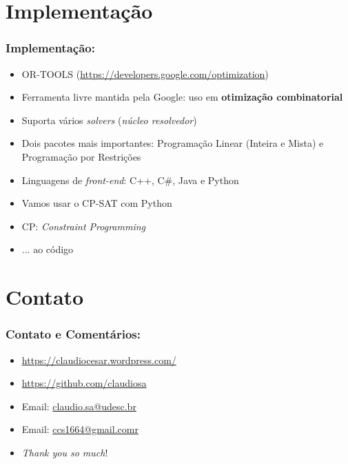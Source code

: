 \documentclass{beamer}
\begin{document}
\section{Implementação}
\begin{frame} 
	\frametitle{Implementação:}
	
	\begin{block}{}
		
		\begin{itemize}
			\item OR-TOOLS  (\url{https://developers.google.com/optimization})
			\item Ferramenta livre mantida pela Google: uso em \textbf{otimização combinatorial}
			\item Suporta vários \textit{solvers} (\textit{núcleo resolvedor})
			\item Dois pacotes mais importantes: Programação Linear (Inteira e Mista)  e Programação por Restrições
			\item Linguagens de \textit{front-end}: C++, C\#, Java e Python
			\item Vamos usar  o CP-SAT com Python
			\item CP: \textit{Constraint Programming}
			\item ... ao código
					
		\end{itemize}
	\end{block}
\end{frame}




\section*{Contato}

\begin{frame}
\frametitle{Contato e Comentários:}
  
\begin{block}{}
  \begin{itemize}
  \item \url{https://claudiocesar.wordpress.com/}
   \item \url{https://github.com/claudiosa}
   \item Email: \url{claudio.sa@udesc.br}
    \item Email: \url{ccs1664@gmail.comr}

  \item \textit{Thank you so much}!

  \end{itemize}
  \end{block}

\end{frame}


\end{document}
